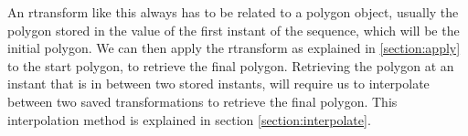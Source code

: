 An rtransform like this always has to be related to a polygon object, usually the polygon stored in the value of the first instant of the sequence, which will be the initial polygon. We can then apply the rtransform as explained in \ref{section:apply} to the start polygon, to retrieve the final polygon. Retrieving the polygon at an instant that is in between two stored instants, will require us to interpolate between two saved transformations to retrieve the final polygon. This interpolation method is explained in section \ref{section:interpolate}.

